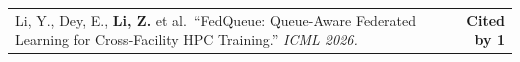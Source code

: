 \documentclass[letterpaper,11pt]{article}
\makeatletter
\newcommand{\CiteEntry}[2]{%
  \item \begin{tabularx}{\linewidth}[t]{@{}X@{\hspace{6pt}}r@{}}
    \small #1 & \small\textbf{Cited by #2}%
  \end{tabularx}%
}
\makeatother
\begin{document}
\begin{enumerate}[leftmargin=1cm, label={[\arabic*]}, itemsep=3pt]
  \CiteEntry{Li, Y., Dey, E., \textbf{Li, Z.} et al.\ ``FedQueue: Queue-Aware Federated Learning for Cross-Facility HPC Training.'' \textit{ICML 2026.}}{1}



\end{enumerate}
\end{document}
